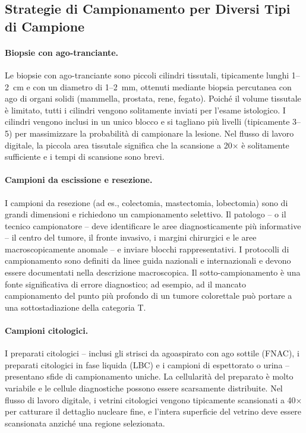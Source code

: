 \subsection{Strategie di Campionamento per Diversi Tipi di Campione}

\paragraph{Biopsie con ago-tranciante.}
Le biopsie con ago-tranciante sono piccoli cilindri tissutali, tipicamente lunghi 1--2~cm e con un
diametro di 1--2~mm, ottenuti mediante biopsia percutanea con ago di organi solidi (mammella,
prostata, rene, fegato). Poiché il volume tissutale è limitato, tutti i cilindri vengono
solitamente inviati per l'esame istologico. I cilindri vengono inclusi in un unico blocco e si
tagliano più livelli (tipicamente 3--5) per massimizzare la probabilità di campionare la lesione.
Nel flusso di lavoro digitale, la piccola area tissutale significa che la scansione a 20$\times$
è solitamente sufficiente e i tempi di scansione sono brevi.

\paragraph{Campioni da escissione e resezione.}
I campioni da resezione (ad es., colectomia, mastectomia, lobectomia) sono di grandi dimensioni
e richiedono un campionamento selettivo. Il patologo -- o il tecnico campionatore -- deve identificare le aree diagnosticamente
più informative -- il centro del tumore, il fronte invasivo, i margini chirurgici e le aree
macroscopicamente anomale -- e inviare blocchi rappresentativi. I protocolli di campionamento
sono definiti da linee guida nazionali e internazionali e devono essere documentati nella
descrizione macroscopica. Il sotto-campionamento è una fonte significativa di errore diagnostico;
ad esempio, ad il mancato campionamento del punto più profondo di un tumore colorettale può portare
a una sottostadiazione della categoria T.

\paragraph{Campioni citologici.}
I preparati citologici -- inclusi gli strisci da agoaspirato con ago sottile (FNAC), i preparati
citologici in fase liquida (LBC) e i campioni di espettorato o urina -- presentano sfide di
campionamento uniche. La cellularità del preparato è molto variabile e le cellule diagnostiche
possono essere scarsamente distribuite. Nel flusso di lavoro digitale, i vetrini citologici
vengono tipicamente scansionati a 40$\times$ per catturare il dettaglio nucleare fine, e l'intera
superficie del vetrino deve essere scansionata anziché una regione selezionata.

